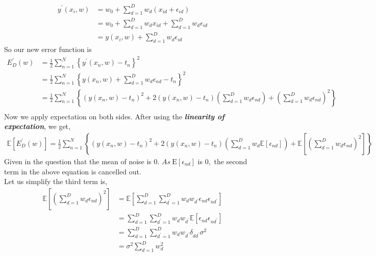 \documentclass[english,a4paper,12pt]{article}
\begin{document}
\begin{enumerate}
    $$
\begin{aligned}
y^{\prime}\left(x_{i}, w\right) &=w_{0}+\sum_{d=1}^{D} w_{d}\left(x_{id}+\epsilon_{i d}\right) \\
&=w_{0}+\sum_{d=1}^{D} w_{d} x_{i d}+\sum_{d=1}^{D} w_{d} \epsilon_{i d} \\
&=y\left(x_{i}, w\right)+\sum_{d=1}^{D} w_{d} \epsilon_{i d}
\end{aligned}
$$
So our new error function is
$$
\begin{aligned}
E_{D}^{\prime}(w) &=\frac{1}{2} \sum_{n=1}^{N}\left\{y^{\prime}\left(x_{n}, w\right)-t_{n}\right\}^{2} \\
&=\frac{1}{2} \sum_{n=1}^{N}\left\{y\left(x_{n}, w\right)+\sum_{d=1}^{D} w_{d} \epsilon_{n d}-t_{n}\right\}^2 \\
&=\frac{1}{2} \sum_{n=1}^{N}\left\{\left(y\left(x_{n}, w\right)-t_{n}\right)^{2}+2\left(y\left(x_{n}, w\right)-t_{n}\right)\left(\sum_{d=1}^{D} w_{d} \epsilon_{n d}\right)+\left(\sum_{d=1}^{D} w_{d} \epsilon_{n d}\right)^{2}\right\} \\
\end{aligned}
$$
Now we apply expectation on both sides. After using the \textit{\textbf{linearity of expectation}}, we get, \\
$$
\begin{aligned}
\mathbb{E}\left[E_{D}^{\prime}(w)\right]=\frac{1}{2} \sum_{n=1}^{N}\left\{\left(y\left(x_{n}, w\right)-t_{n}\right)^{2}+2\left(y\left(x_{n}, w\right)-t_{n}\right)\left(\sum_{d=1}^{D} w_{d} \mathbb{E}\left[\epsilon_{n d}\right]\right)+\mathbb{E}\left[\left(\sum_{d=1}^{D} w_{d} \epsilon_{n d}\right)^{2}\right]\right\}
\end{aligned}
$$
Given in the question that the mean of noise is 0.
$As \ \mathrm{E}\left[\epsilon_{n d}\right]$ is $0,$ the second term in the above equation is cancelled out.
\\Let us simplify the third term is,
$$
\begin{aligned}
\mathbb{E}\left[\left(\sum_{d=1}^{D} w_{d} \epsilon_{n d}\right)^{2}\right] &=\mathbb{E}\left[\sum_{d=1}^{D} \sum_{d^{\prime}=1}^{D} w_{d} w_{d^{\prime}} \epsilon_{n d} \epsilon_{n d^{\prime}}\right] \\
&=\sum_{d=1}^{D} \sum_{d^{\prime}=1}^{D} w_{d} w_{d^{\prime}} \mathbb{E}\left[\epsilon_{n d} \epsilon_{n d^{\prime}}\right] \\
&=\sum_{d=1}^{D} \sum_{d^{\prime}=1}^{D} w_{d} w_{d^{\prime}} \delta_{d d^{\prime}}\sigma^2 \\
&=\sigma^2\sum_{d=1}^{D} w_{d}^{2}

\end{aligned}$$
\end{enumerate}
\end{document}
